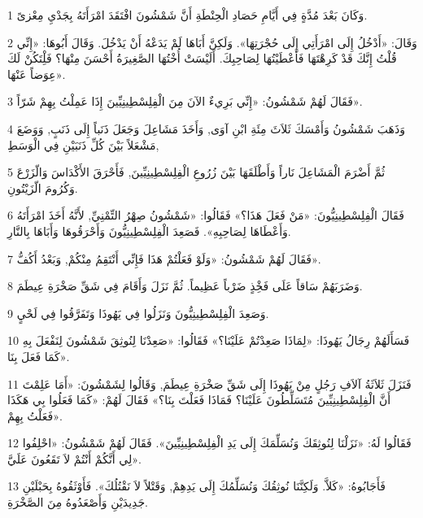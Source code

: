 \par 1 وَكَانَ بَعْدَ مُدَّةٍ فِي أَيَّامِ حَصَادِ الْحِنْطَةِ أَنَّ شَمْشُونَ افْتَقَدَ امْرَأَتَهُ بِجَدْيِ مِعْزىً.
\par 2 وَقَالَ: «أَدْخُلُ إِلَى امْرَأَتِي إِلَى حُجْرَتِهَا». وَلَكِنَّ أَبَاهَا لَمْ يَدَعْهُ أَنْ يَدْخُلَ. وَقَالَ أَبُوهَا: «إِنِّي قُلْتُ إِنَّكَ قَدْ كَرِهْتَهَا فَأَعْطَيْتُهَا لِصَاحِبِكَ. أَلَيْسَتْ أُخْتُهَا الصَّغِيرَةُ أَحْسَنَ مِنْهَا؟ فَلِْتَكُنْ لَكَ عِوَضاً عَنْهَا».
\par 3 فَقَالَ لَهُمْ شَمْشُونُ: «إِنِّي بَرِيءٌ الآنَ مِنَ الْفِلِسْطِينِيِّينَ إِذَا عَمِلْتُ بِهِمْ شَرّاً».
\par 4 وَذَهَبَ شَمْشُونُ وَأَمْسَكَ ثَلاَثَ مِئَةِ ابْنِ آوَى, وَأَخَذَ مَشَاعِلَ وَجَعَلَ ذَنَباً إِلَى ذَنَبٍ, وَوَضَعَ مَشْعَلاً بَيْنَ كُلِّ ذَنَبَيْنِ فِي الْوَسَطِ,
\par 5 ثُمَّ أَضْرَمَ الْمَشَاعِلَ نَاراً وَأَطْلَقَهَا بَيْنَ زُرُوعِ الْفِلِسْطِينِيِّينَ, فَأَحْرَقَ الأَكْدَاسَ وَالّزَرْعَ وَكُرُومَ الّزَيْتُونِ.
\par 6 فَقَالَ الْفِلِسْطِينِيُّونَ: «مَنْ فَعَلَ هَذَا؟» فَقَالُوا: «شَمْشُونُ صِهْرُ التِّمْنِيِّ, لأَنَّهُ أَخَذَ امْرَأَتَهُ وَأَعْطَاهَا لِصَاحِبِهِ». فَصَعِدَ الْفِلِسْطِينِيُّونَ وَأَحْرَقُوهَا وَأَبَاهَا بِالنَّارِ.
\par 7 فَقَالَ لَهُمْ شَمْشُونُ: «وَلَوْ فَعَلْتُمْ هَذَا فَإِنِّي أَنْتَقِمُ مِنْكُمْ, وَبَعْدُ أَكُفُّ».
\par 8 وَضَرَبَهُمْ سَاقاً عَلَى فَخِْذٍ ضَرْباً عَظِيماً. ثُمَّ نَزَلَ وَأَقَامَ فِي شَقِّ صَخْرَةِ عِيطَمَ.
\par 9 وَصَعِدَ الْفِلِسْطِينِيُّونَ وَنَزَلُوا فِي يَهُوذَا وَتَفَرَّقُوا فِي لَحْيٍ.
\par 10 فَسَأَلَهُمْ رِجَالُ يَهُوذَا: «لِمَاذَا صَعِدْتُمْ عَلَيْنَا؟» فَقَالُوا: «صَعِدْنَا لِنُوثِقَ شَمْشُونَ لِنَفْعَلَ بِهِ كَمَا فَعَلَ بِنَا».
\par 11 فَنَزَلَ ثَلاَثَةُ آلاَفِ رَجُلٍ مِنْ يَهُوذَا إِلَى شَقِّ صَخْرَةِ عِيطَمَ, وَقَالُوا لِشَمْشُونَ: «أَمَا عَلِمْتَ أَنَّ الْفِلِسْطِينِيِّينَ مُتَسَلِّطُونَ عَلَيْنَا؟ فَمَاذَا فَعَلْتَ بِنَا؟» فَقَالَ لَهُمْ: «كَمَا فَعَلُوا بِي هَكَذَا فَعَلْتُ بِهِمْ».
\par 12 فَقَالُوا لَهُ: «نَزَلْنَا لِنُوثِقَكَ وَنُسَلِّمَكَ إِلَى يَدِ الْفِلِسْطِينِيِّينَ». فَقَالَ لَهُمْ شَمْشُونُ: «احْلِفُوا لِي أَنَّكُمْ أَنْتُمْ لاَ تَقَعُونَ عَلَيَّ».
\par 13 فَأَجَابُوهُ: «كَلاَّ. وَلَكِنَّنَا نُوثِقُكَ وَنُسَلِّمُكَ إِلَى يَدِهِمْ, وَقَتْلاً لاَ نَقْتُلُكَ». فَأَوْثَقُوهُ بِحَبْلَيْنِ جَدِيدَيْنِ وَأَصْعَدُوهُ مِنَ الصَّخْرَةِ.
